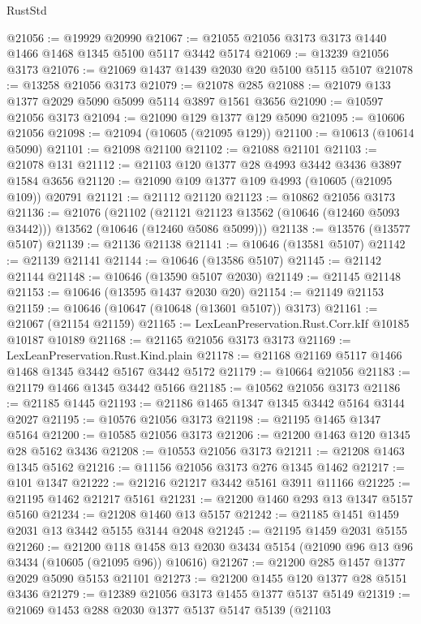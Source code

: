 \begin{lexlean}{RustStd}
\begin{coremodule}
@21056 := @19929 @20990
@21067 := @21055 @21056 @3173 @3173 @1440 @1466 @1468 @1345 @5100 @5117 @3442 @5174
@21069 := @13239 @21056 @3173
@21076 := @21069 @1437 @1439 @2030 @20 @5100 @5115 @5107
@21078 := @13258 @21056 @3173
@21079 := @21078 @285
@21088 := @21079 @133 @1377 @2029 @5090 @5099 @5114 @3897 @1561 @3656
@21090 := @10597 @21056 @3173
@21094 := @21090 @129 @1377 @129 @5090
@21095 := @10606 @21056
@21098 := @21094 (@10605 (@21095 @129))
@21100 := @10613 (@10614 @5090)
@21101 := @21098 @21100
@21102 := @21088 @21101
@21103 := @21078 @131
@21112 := @21103 @120 @1377 @28 @4993 @3442 @3436 @3897 @1584 @3656
@21120 := @21090 @109 @1377 @109 @4993 (@10605 (@21095 @109)) @20791
@21121 := @21112 @21120
@21123 := @10862 @21056 @3173
@21136 := @21076
    (@21102
      (@21121 @21123 @13562 (@10646 (@12460 @5093 @3442)))
      @13562
      (@10646 (@12460 @5086 @5099)))
@21138 := @13576 (@13577 @5107)
@21139 := @21136 @21138
@21141 := @10646 (@13581 @5107)
@21142 := @21139 @21141
@21144 := @10646 (@13586 @5107)
@21145 := @21142 @21144
@21148 := @10646 (@13590 @5107 @2030)
@21149 := @21145 @21148
@21153 := @10646 (@13595 @1437 @2030 @20)
@21154 := @21149 @21153
@21159 := @10646 (@10647 (@10648 (@13601 @5107)) @3173)
@21161 := @21067 (@21154 @21159)
@21165 := LexLeanPreservation.Rust.Corr.kIf @10185 @10187 @10189
@21168 := @21165 @21056 @3173 @3173
@21169 := LexLeanPreservation.Rust.Kind.plain
@21178 := @21168 @21169 @5117 @1466 @1468 @1345 @3442 @5167 @3442 @5172
@21179 := @10664 @21056
@21183 := @21179 @1466 @1345 @3442 @5166
@21185 := @10562 @21056 @3173
@21186 := @21185 @1445
@21193 := @21186 @1465 @1347 @1345 @3442 @5164 @3144 @2027
@21195 := @10576 @21056 @3173
@21198 := @21195 @1465 @1347 @5164
@21200 := @10585 @21056 @3173
@21206 := @21200 @1463 @120 @1345 @28 @5162 @3436
@21208 := @10553 @21056 @3173
@21211 := @21208 @1463 @1345 @5162
@21216 := @11156 @21056 @3173 @276 @1345 @1462
@21217 := @101 @1347
@21222 := @21216 @21217 @3442 @5161 @3911 @11166
@21225 := @21195 @1462 @21217 @5161
@21231 := @21200 @1460 @293 @13 @1347 @5157 @5160
@21234 := @21208 @1460 @13 @5157
@21242 := @21185 @1451 @1459 @2031 @13 @3442 @5155 @3144 @2048
@21245 := @21195 @1459 @2031 @5155
@21260 := @21200
    @118
    @1458
    @13
    @2030
    @3434
    @5154
    (@21090 @96 @13 @96 @3434 (@10605 (@21095 @96)) @10616)
@21267 := @21200 @285 @1457 @1377 @2029 @5090 @5153 @21101
@21273 := @21200 @1455 @120 @1377 @28 @5151 @3436
@21279 := @12389 @21056 @3173 @1455 @1377 @5137 @5149
@21319 := @21069
    @1453
    @288
    @2030
    @1377
    @5137
    @5147
    @5139
    (@21103

\end{coremodule}
\end{lexlean}
